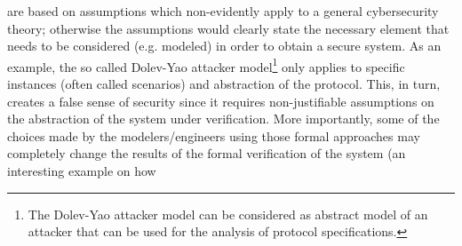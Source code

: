\documentclass[conference]{IEEEtran}
\newcommand{\fixnote}[2]{\textbf{\color{red}{FIX}}\footnote{{\bf #1:} #2}}
\begin{document}
are based on assumptions which non-evidently apply to a general cybersecurity
theory; otherwise the assumptions would clearly state the necessary element
that needs to be considered (e.g. modeled) in order to obtain a secure system.
As an example, the so called Dolev-Yao attacker model\footnote{The Dolev-Yao
attacker model can be considered as abstract model of an attacker that can be
used for the analysis of protocol specifications.} \autocite{Dolev1983security}
only applies to specific instances (often called scenarios) and abstraction of
the protocol.  This, in turn, creates a false sense of security since it
requires non-justifiable assumptions on the abstraction of the system under
verification.
More importantly, some of the choices made by the
modelers/engineers using those formal approaches may completely change the
results of the formal verification of the system (an interesting example on how
\end{document}
